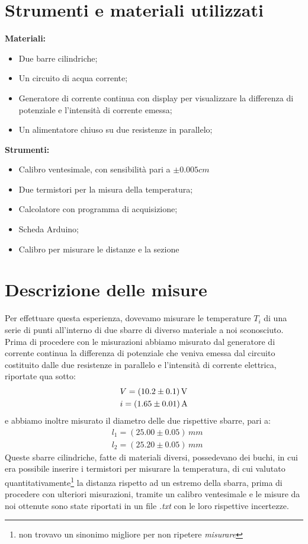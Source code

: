 \documentclass{article}
\begin{document}
\section{Strumenti e materiali utilizzati}

\textbf{Materiali:}
\begin{itemize}
	\item Due barre cilindriche;
	\item Un circuito di acqua corrente;
	\item Generatore di corrente continua con display per visualizzare la differenza di potenziale e l'intensità di corrente emessa;
	\item Un alimentatore chiuso su due resistenze in parallelo;
\end{itemize}
\textbf{Strumenti:}
\begin{itemize}
	\item Calibro ventesimale, con sensibilità pari a $\pm 0.005 cm$
	\item Due termistori per la misura della temperatura;
	\item Calcolatore con programma di acquisizione;
	\item Scheda Arduino;
	\item Calibro per misurare le distanze e la sezione
\end{itemize}
\section{Descrizione delle misure}

Per effettuare questa esperienza, dovevamo misurare le temperature $T_i$ di una serie di punti all'interno di due sbarre di diverso materiale a noi sconosciuto. \\
Prima di procedere con le misurazioni abbiamo misurato dal generatore di corrente continua la differenza di potenziale che veniva emessa dal circuito costituito dalle due resistenze in parallelo e l'intensità di corrente elettrica, riportate qua sotto:
\begin{align*}
	&V = (10.2 \pm 0.1) \, \text{\unit{V}} \\
	&i = (1.65 \pm 0.01) \, \text{\unit{A}}
\end{align*}
e abbiamo inoltre misurato il diametro delle due rispettive sbarre, pari a:
\begin{align*}
	&l_1  = (25.00 \pm 0.05) \, \unit{mm} \\
	&l_2  = (25.20 \pm 0.05) \, \unit{mm}
\end{align*}
Queste sbarre cilindriche, fatte di materiali diversi, possedevano dei buchi, in cui era possibile inserire i termistori per misurare la temperatura, di cui valutato quantitativamente\footnote{non trovavo un sinonimo migliore per non ripetere \emph{misurare}} la distanza rispetto ad un estremo della sbarra, prima di procedere con ulteriori misurazioni, tramite un calibro ventesimale e le misure da noi ottenute sono state riportati in un file \emph{.txt} con le loro rispettive incertezze.
\end{document}
